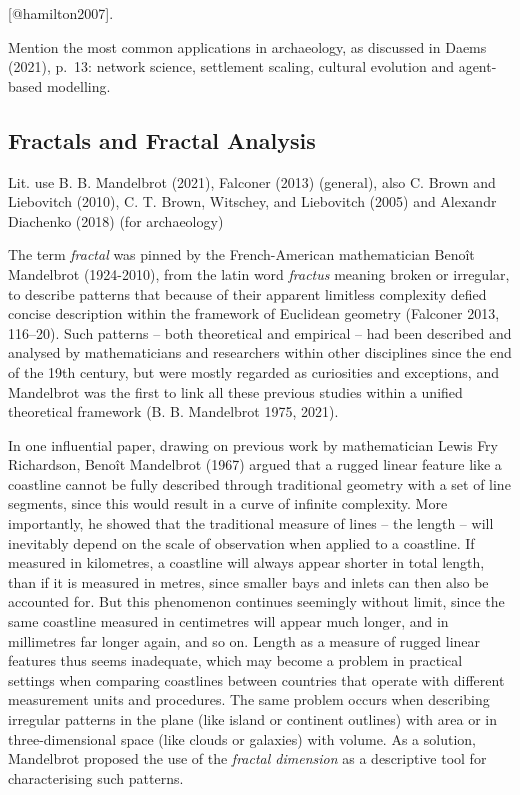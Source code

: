 \documentclass[
  12pt,
  a4paper, twoside]{book}
\begin{document}
{[}@hamilton2007{]}.

Mention the most common applications in archaeology, as discussed in Daems (2021), p.~13: network science, settlement scaling, cultural evolution and agent-based modelling.

\hypertarget{fractals}{%
\subsection{Fractals and Fractal Analysis}\label{fractals}}

Lit. use B. B. Mandelbrot (2021), Falconer (2013) (general), also C. Brown and Liebovitch (2010), C. T. Brown, Witschey, and Liebovitch (2005) and Alexandr Diachenko (2018) (for archaeology)

The term \emph{fractal} was pinned by the French-American mathematician Benoît Mandelbrot (1924-2010), from the latin word \emph{fractus} meaning broken or irregular, to describe patterns that because of their apparent limitless complexity defied concise description within the framework of Euclidean geometry (Falconer 2013, 116--20). Such patterns -- both theoretical and empirical -- had been described and analysed by mathematicians and researchers within other disciplines since the end of the 19th century, but were mostly regarded as curiosities and exceptions, and Mandelbrot was the first to link all these previous studies within a unified theoretical framework (B. B. Mandelbrot 1975, 2021).

In one influential paper, drawing on previous work by mathematician Lewis Fry Richardson, Benoît Mandelbrot (1967) argued that a rugged linear feature like a coastline cannot be fully described through traditional geometry with a set of line segments, since this would result in a curve of infinite complexity. More importantly, he showed that the traditional measure of lines -- the length -- will inevitably depend on the scale of observation when applied to a coastline. If measured in kilometres, a coastline will always appear shorter in total length, than if it is measured in metres, since smaller bays and inlets can then also be accounted for. But this phenomenon continues seemingly without limit, since the same coastline measured in centimetres will appear much longer, and in millimetres far longer again, and so on. Length as a measure of rugged linear features thus seems inadequate, which may become a problem in practical settings when comparing coastlines between countries that operate with different measurement units and procedures. The same problem occurs when describing irregular patterns in the plane (like island or continent outlines) with area or in three-dimensional space (like clouds or galaxies) with volume. As a solution, Mandelbrot proposed the use of the \emph{fractal dimension} as a descriptive tool for characterising such patterns.
\end{document}
